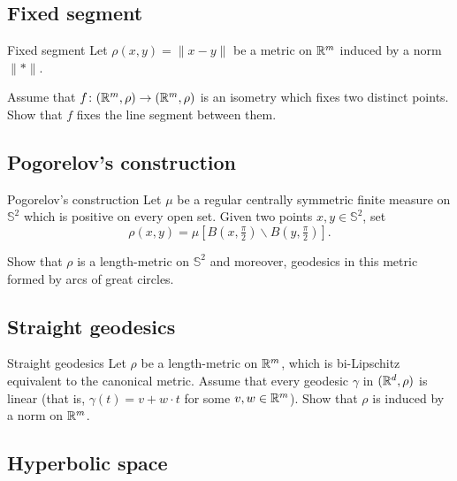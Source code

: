 \subsection*{Fixed segment}

\begin{pr}{}{Fixed segment}\label{Fixed segment}
Let $\rho(x,y)=\|x-y\|$ be a metric on $\mathbb{R}^m$ induced by a norm $\|{*}\|$.

Assume that $f\colon(\mathbb{R}^m,\rho)\to(\mathbb{R}^m,\rho)$ is an isometry which fixes two distinct points.
Show that $f$ fixes the line segment between them.
\end{pr}

\subsection*{Pogorelov's construction\easy}

\begin{pr}{}{Pogorelov's construction}\label{Pogorelov's construction}
Let $\mu$ be a regular centrally symmetric finite measure on $\mathbb{S}^2$ which is positive on every open set.
Given two points $x,y\in \mathbb{S}^2$,
set 
\[\rho(x,y)=\mu[B(x,\tfrac \pi2)\backslash B(y,\tfrac\pi2)].\]

Show that $\rho$ is a length-metric on $\mathbb{S}^2$
and moreover, geodesics in this metric formed by arcs of great circles.
\end{pr}

\subsection*{Straight geodesics}

\begin{pr}{}{Straight geodesics}\label{Straight geodesics}
Let $\rho$ be a length-metric on $\mathbb{R}^m$, 
which is bi-Lipschitz equivalent to the canonical metric.
Assume that every geodesic $\gamma$ in $(\mathbb{R}^d,\rho)$ is linear 
(that is, $\gamma(t)=v+w\cdot t$ for some $v,w\in\mathbb{R}^m$).
Show that $\rho$ is induced by a norm on $\mathbb{R}^m$.
\end{pr}

\subsection*{Hyperbolic space}

